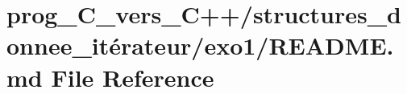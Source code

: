 \hypertarget{prog__C__vers__C_09_09_2structures__donnee__it_xC3_xA9rateur_2exo1_2README_8md}{}\section{prog\+\_\+\+C\+\_\+vers\+\_\+\+C++/structures\+\_\+donnee\+\_\+itérateur/exo1/\+R\+E\+A\+D\+ME.md File Reference}
\label{prog__C__vers__C_09_09_2structures__donnee__it_xC3_xA9rateur_2exo1_2README_8md}

